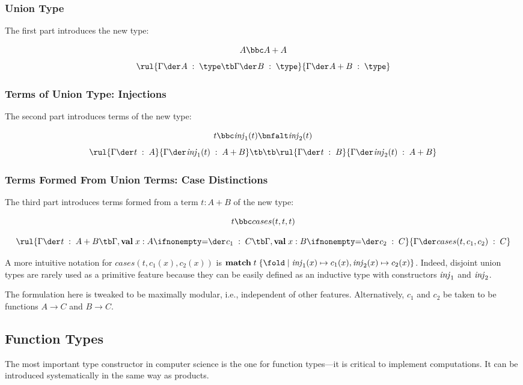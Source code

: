 \subsubsection{Union Type}

The first part introduces the new type:

\[A \bbc A+ A\]
\[\rul{\oftype{}{\Gamma}{A}{\type}\tb \oftype{}{\Gamma}{B}{\type}}{\oftype{}{\Gamma}{A+ B}{\type}}\]

\subsubsection{Terms of Union Type: Injections}

The second part introduces terms of the new type:

\[t \bbc \inj_1(t) \bnfalt \inj_2(t)\]
\[\rul{\oftype{}{\Gamma}{t}{A}}{\oftype{}{\Gamma}{\inj_1(t)}{A+B}}
\tb\tb
\rul{\oftype{}{\Gamma}{t}{B}}{\oftype{}{\Gamma}{\inj_2(t)}{A+B}}\]

\subsubsection{Terms Formed From Union Terms: Case Distinctions}

The third part introduces terms formed from a term $t:A+ B$ of the new type:

\[t \bbc cases(t,t,t)\]

\[\rul{\oftype{}{\Gamma}{t}{A + B} \tb \oftype{}{\Gamma,\aval{x}{A}{}}{c_1}{C}\tb \oftype{}{\Gamma,\aval{x}{B}{}}{c_2}{C}}{\oftype{}{\Gamma}{cases(t,c_1,c_2)}{C}}\]

A more intuitive notation for $cases(t,c_1(x),c_2(x))$ is $\amatchI{t}{\acase{\inj_1(x)}{c_1(x)},\acase{\inj_2(x)}{c_2(x)}}$.
Indeed, disjoint union types are rarely used as a primitive feature because they can be easily defined as an inductive type with constructors $\mathit{inj}_1$ and $\mathit{inj}_2$.

The formulation here is tweaked to be maximally modular, i.e., independent of other features.
Alternatively, $c_1$ and $c_2$ be taken to be functions $A\to C$ and $B\to C$.

\subsection{Function Types}

The most important type constructor in computer science is the one for function types---it is critical to implement computations.
It can be introduced systematically in the same way as products.

